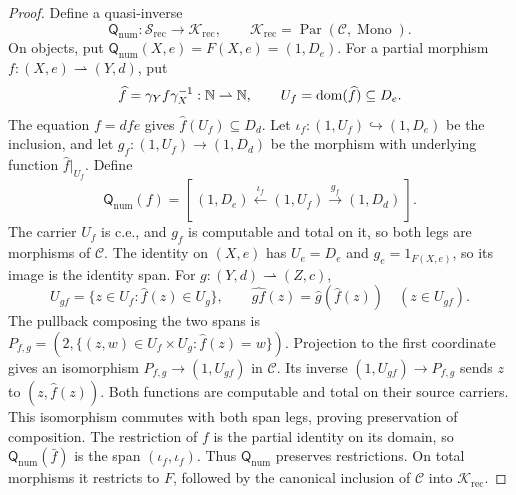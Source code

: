 \begin{proof}
Define a quasi-inverse
\[
 \mathsf Q_{\mathrm{num}}:\mathscr S_{\mathrm{rec}}
       \longrightarrow\mathcal K_{\mathrm{rec}},
 \qquad
 \mathcal K_{\mathrm{rec}}
       =\operatorname{Par}(\mathcal C,\operatorname{Mono}).
\]
On objects, put $\mathsf Q_{\mathrm{num}}(X,e)=F(X,e)=(1,D_e)$.
For a partial morphism $f:(X,e)\rightharpoonup(Y,d)$, put
\[
 \widehat f=\gamma_Y f\gamma_X^{-1}:\mathbb N\rightharpoonup\mathbb N,
 \qquad U_f=\operatorname{dom}(\widehat f)\subseteq D_e.
\]
The equation $f=dfe$ gives $\widehat f(U_f)\subseteq D_d$.
Let $\iota_f:(1,U_f)\hookrightarrow(1,D_e)$ be the inclusion,
and let $g_f:(1,U_f)\to(1,D_d)$ be the morphism with underlying
function $\widehat f|_{U_f}$. Define
\[
 \mathsf Q_{\mathrm{num}}(f)=
 [\,(1,D_e)\xleftarrow{\iota_f}(1,U_f)
                      \xrightarrow{g_f}(1,D_d)\,].
\]
The carrier $U_f$ is c.e., and $g_f$ is computable and total on it,
so both legs are morphisms of $\mathcal C$.
The identity on $(X,e)$ has $U_e=D_e$ and $g_e=1_{F(X,e)}$,
so its image is the identity span.
For $g:(Y,d)\rightharpoonup(Z,c)$,
\[
 U_{gf}=\{z\in U_f:\widehat f(z)\in U_g\},\qquad
 \widehat{gf}(z)=\widehat g(\widehat f(z))\quad(z\in U_{gf}).
\]
The pullback composing the two spans is
$P_{f,g}=(2,\{(z,w)\in U_f\times U_g:\widehat f(z)=w\})$.
Projection to the first coordinate gives an isomorphism
$P_{f,g}\to(1,U_{gf})$ in $\mathcal C$. Its inverse
$(1,U_{gf})\to P_{f,g}$ sends $z$ to $(z,\widehat f(z))$.
Both functions are computable and total on their source carriers.
This isomorphism commutes with both span legs, proving
preservation of composition.
The restriction of $f$ is the partial identity on its domain,
so $\mathsf Q_{\mathrm{num}}(\bar f)$ is the span
$(\iota_f,\iota_f)$. Thus $\mathsf Q_{\mathrm{num}}$ preserves
restrictions. On total morphisms it restricts to $F$, followed by
the canonical inclusion of $\mathcal C$ into $\mathcal K_{\mathrm{rec}}$.


\end{proof}
